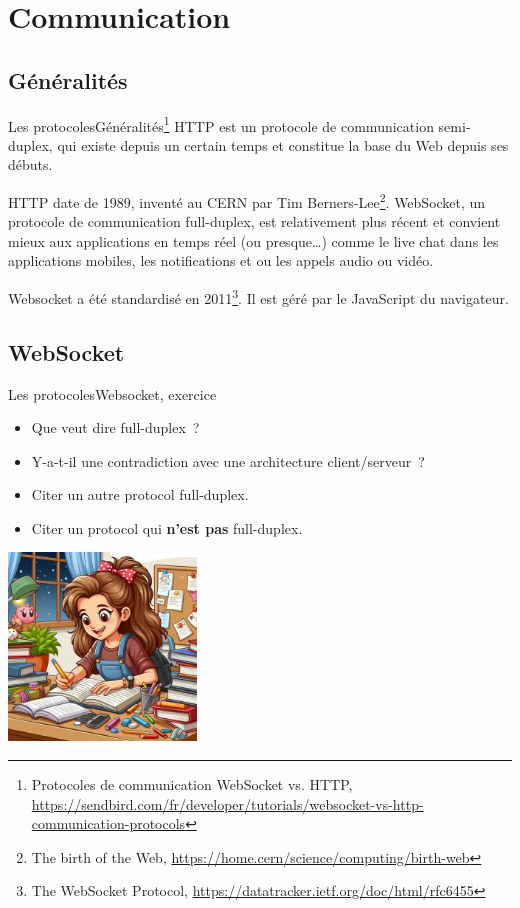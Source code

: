 \documentclass{beamer}
\begin{document}
    \section{Communication}\label{sec:communication}

    \subsection{Généralités}\label{subsec:communication-basics}
    \begin{frame}{Les protocoles}{Généralités\footnote{\label{sendbird-protocole}Protocoles de communication WebSocket vs. HTTP, \url{https://sendbird.com/fr/developer/tutorials/websocket-vs-http-communication-protocols}}}
        HTTP est un protocole de communication semi-duplex, qui existe depuis un certain temps et constitue la base du Web depuis ses débuts.

        HTTP date de 1989, inventé au CERN par Tim Berners-Lee\footnote{The birth of the Web, \url{https://home.cern/science/computing/birth-web}}.
        \bigbreak
        WebSocket, un protocole de communication full-duplex, est relativement plus récent et convient mieux aux applications en temps réel (ou presque\ldots) comme le live chat dans les applications mobiles, les notifications et ou les appels audio ou vidéo.

        Websocket a été standardisé en 2011\footnote{The WebSocket Protocol, \url{https://datatracker.ietf.org/doc/html/rfc6455}}.
        Il est géré par le JavaScript du navigateur.
    \end{frame}

    \subsection{WebSocket}\label{subsec:websocket}

    \begin{frame}{Les protocoles}{Websocket, exercice \execcounterdispinc{}}
        \begin{itemize}
            \item Que veut dire full-duplex~?
            \item Y-a-t-il une contradiction avec une architecture client/serveur~?
            \item Citer un autre protocol full-duplex.
            \item Citer un protocol qui \textbf{n'est pas} full-duplex.
        \end{itemize}
        \bigbreak
        \centering
        \includegraphics[width=5cm]{image/homework}
    \end{frame}
\end{document}
